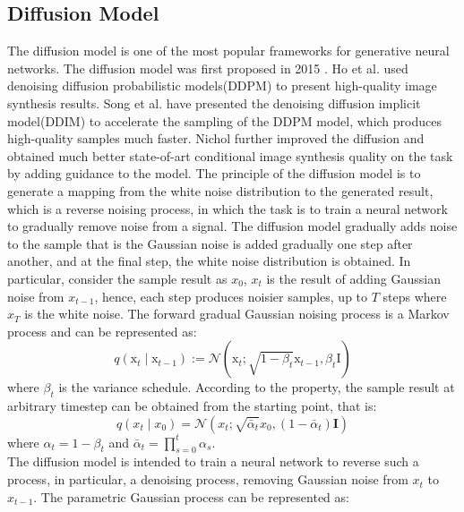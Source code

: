 \documentclass{article}
\begin{document}
\subsection{Diffusion Model}
The diffusion model is one of the most popular frameworks for generative neural networks. The diffusion model was first proposed in 2015 \cite{Dif-0-cD-sohl2015deep}. Ho et al. used denoising diffusion probabilistic models(DDPM) to present high-quality image synthesis results\cite{Dif-1-cD-ho2020denoising}. Song et al. have presented the denoising diffusion implicit model(DDIM) to accelerate the sampling of the DDPM model, which produces high-quality samples much faster\cite{Dif-3-song2020denoising}. Nichol further improved the diffusion and obtained much better state-of-art conditional image synthesis quality on the task\cite{Dif-2-cD-dhariwal2021diffusion} by adding guidance to the model. The principle of the diffusion model is to generate a mapping from the white noise distribution to the generated result, which is a reverse noising process, in which the task is to train a neural network to gradually remove noise from a signal. The diffusion model gradually adds noise to the sample that is the Gaussian noise is added gradually one step after another, and at the final step, the white noise distribution is obtained. In particular, consider the sample result as $x_0$, $x_t$ is the result of adding Gaussian noise from $x_{t-1}$, hence, each step produces noisier samples, up to $T$ steps where $x_T$ is the white noise. The forward  gradual Gaussian noising process is a Markov process and can be represented as:
\begin{equation}
q\left(\mathrm{x}_t \mid \mathrm{x}_{t-1}\right):=\mathcal{N}\left(\mathrm{x}_t ; \sqrt{1-\beta_t} \mathrm{x}_{t-1}, \beta_t \mathrm{I}\right)
\end{equation}
where $\beta_t$ is the variance schedule. According to the property, the sample result at arbitrary timestep can be obtained from the starting point, that is:
\begin{equation}
q\left(x_t \mid x_0\right)=\mathcal{N}\left(x_t ; \sqrt{\bar{\alpha}_t} x_0,\left(1-\bar{\alpha}_t\right) \mathbf{I}\right)
\end{equation}
where $\alpha_t=1-\beta_t$ and 
$\bar{\alpha}_t =\prod_{s=0}^t \alpha_s$.\\
The diffusion model is intended to train a neural network to reverse such a process, in particular, a denoising process, removing Gaussian noise from $x_t$ to $x_{t-1}$. The parametric Gaussian process can be represented as:
\end{document}
